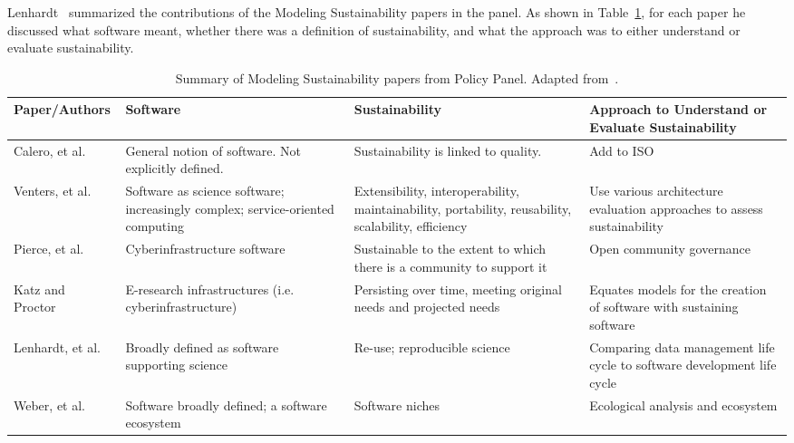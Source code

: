 \documentclass[11pt, oneside]{amsart}
\begin{document}
Lenhardt~\cite{lenhardt-wssspe1-panel} summarized the contributions of the
Modeling Sustainability papers in the panel. As shown in
Table~\ref{tab:defining-sustainability}, for each paper he discussed what
software meant, whether there was a definition of sustainability, and what the
approach was to either understand or evaluate sustainability.

\begin{table}[t]
  \begin{scriptsize}
    \begin{center}
      \caption{Summary of Modeling Sustainability papers from Policy Panel.  Adapted from~\cite{lenhardt-wssspe1-panel}.}
      \label{tab:defining-sustainability}
      \begin{tabular}{|p{2.3cm}|p{3.6cm}|p{4.4cm}|p{4.8cm}|}
                \hline
{\bf Paper/Authors}
& {\bf Software}
& {\bf Sustainability}
& {\bf Approach to Understand or Evaluate Sustainability} \\
                \hline
Calero, et al.~\cite{Calero_WSSSPE}
& General notion of software. Not explicitly defined.
& Sustainability is linked to quality.
& Add to ISO \\
                \hline
Venters, et al.~\cite{Venters_WSSSPE}
& Software as science software; increasingly complex; service-oriented computing
& Extensibility, interoperability, maintainability, portability, reusability, scalability, efficiency
& Use various architecture evaluation approaches to assess sustainability \\
                \hline
Pierce, et al.~\cite{Pierce_WSSSPE}
& Cyberinfrastructure software
& Sustainable to the extent to which there is a community to support it
& Open community governance \\
                \hline
Katz and Proctor~\cite{Katz_WSSSPE}
& E-research infrastructures (i.e. cyberinfrastructure)
& Persisting over time, meeting original needs and projected needs
& Equates models for the creation of software with sustaining software \\
                \hline
Lenhardt, et al.~\cite{Lenhardt_WSSSPE}
& Broadly defined as software supporting science
& Re-use; reproducible science
& Comparing data management life cycle to software development life cycle \\
                \hline
Weber, et al.~\cite{Weber_WSSSPE}
& Software broadly defined; a software ecosystem
& Software niches
& Ecological analysis and ecosystem \\
                \hline
     \end{tabular}
    \end{center}
  \end{scriptsize}
\end{table}
\end{document}
